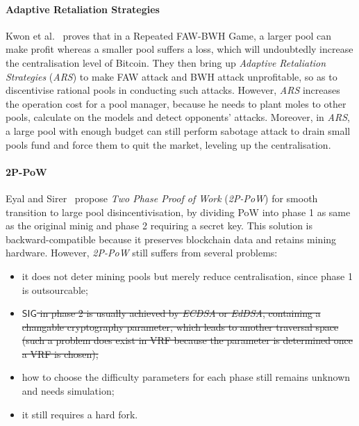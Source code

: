\paragraph{\textbf{Adaptive Retaliation Strategies}}
Kwon et al.~\cite{kwon2019eye} proves that in a Repeated FAW\cite{courtois2014subversive,rosenfeld2011analysis}-BWH\cite{kwon2017selfish} Game, a larger pool can make profit whereas a smaller pool suffers a loss, which will undoubtedly increase the centralisation level of Bitcoin.
They then bring up \textit{Adaptive Retaliation Strategies} (\textit{ARS}) to make FAW attack and BWH attack unprofitable, so as to discentivise rational pools in conducting such attacks.
However, \textit{ARS} increases the operation cost for a pool manager, because he needs to plant moles to other pools, calculate on the models and detect opponents' attacks.
Moreover, in \textit{ARS}, a large pool with enough budget can still perform sabotage attack to drain small pools fund and force them to quit the market, leveling up the centralisation.

\paragraph{\textbf{2P-PoW}}
Eyal and Sirer~\cite{2P-PoW} propose \textit{Two Phase Proof of Work} (\textit{2P-PoW}) for smooth transition to large pool disincentivisation, by dividing PoW into phase 1 as same as the original minig and phase 2 requiring a secret key.
This solution is backward-compatible because it preserves blockchain data and retains mining hardware. 
However, \textit{2P-PoW} still suffers from several problems:
\begin{itemize}
\renewcommand\labelitemi{$\bullet$}
    \item it does not deter mining pools but merely reduce centralisation, since phase 1 is outsourcable;
    \item \sout{$\mathsf{SIG}$ in phase 2 is usually achieved by \textit{ECDSA} or \textit{EdDSA}, containing a changable cryptography parameter, which leads to another traversal space (such a problem does exist in VRF because the parameter is determined once a VRF is chosen);} 
    \item how to choose the difficulty parameters for each phase still remains unknown and needs simulation;
    \item it still requires a hard fork.
\end{itemize}



